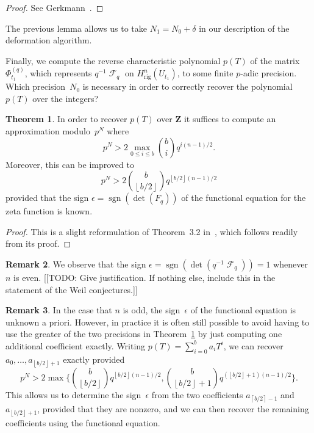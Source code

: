 \documentclass[a4paper,11pt]{article}
\numberwithin{equation}{section}
\providecommand{\floor}[1]{\left\lfloor#1\right\rfloor}   %
\providecommand{\ceil}[1]{\left\lceil#1\right\rceil}   %
\DeclareMathOperator{\sgn}{sgn}          %
\DeclareMathOperator{\Frob}{\mathcal{F}} %
\providecommand{\Hrig}{H_{\text{rig}}}  %
\theoremstyle{definition}
\newtheorem{thm}{Theorem}[section]
\newtheorem{rem}[thm]{Remark}
\begin{document}
\begin{proof} 
See Gerkmann~\citep[Lemma~3.3, Lemma~3.4]{Gerkmann2007}.
\end{proof}

The previous lemma allows us to take $N_1 = N_0 + \delta$ in our 
description of the deformation algorithm.

Finally, we compute the 
reverse characteristic polynomial $p(T)$ of the matrix $\Phi_{t_1}^{(q)}$, 
which represents $q^{-1} \Frob_q$ on $\Hrig^n(U_{t_1})$, to some finite 
$p$-adic precision.  Which precision~$N_0$ is necessary in order to 
correctly recover the polynomial~$p(T)$ over the integers?

\begin{thm} \label{thm:N0}
In order to recover $p(T)$ over $\mathbf{Z}$ it suffices to compute 
an approximation modulo~$p^N$ where 
\begin{equation}
p^N > 2 \max_{0 \leq i \leq b} \binom{b}{i} q^{i (n-1) / 2}.
\end{equation}
Moreover, this can be improved to 
\begin{equation}
p^N > 2 \binom{b}{\floor{b/2}} q^{\floor{b/2} (n-1) / 2}
\end{equation}
provided that the sign $\epsilon = \sgn(\det(F_q))$ of the 
functional equation for the zeta function is known.
\end{thm}

\begin{proof}
This is a slight reformulation of {Theorem~3.2} in~\citep{Gerkmann2007}, 
which follows readily from its proof.
\end{proof}

\begin{rem}
We observe that the sign $\epsilon = \sgn(\det(q^{-1} \Frob_q)) = 1$ 
whenever $n$ is even.  [[TODO: Give justification.  If nothing else, 
include this in the statement of the Weil conjectures.]]
\end{rem}

\begin{rem}
In the case that $n$ is odd, the sign~$\epsilon$ of the functional 
equation is unknown a priori.  However, in practice it is often still 
possible to avoid having to use the greater of the two precisions in 
Theorem~\ref{thm:N0} by just computing one additional coefficient 
exactly.  Writing $p(T) = \sum_{i=0}^{b} a_i T^i$, we can recover 
$a_0, \dotsc, a_{\floor{b/2}+1}$ exactly provided 
\begin{equation}
p^N > 2 \max\biggl\{\binom{b}{\floor{b/2}} q^{\floor{b/2} (n-1) / 2}, 
                   \binom{b}{\floor{b/2}+1} q^{(\floor{b/2}+1) (n-1)/2} \biggr\}.
\end{equation}
This allows us to determine the sign~$\epsilon$ from the two 
coefficients $a_{\ceil{b/2}-1}$ and $a_{\floor{b/2}+1}$, provided 
that they are nonzero, and we can then recover the remaining 
coefficients using the functional equation.
\end{rem}
\end{document}
